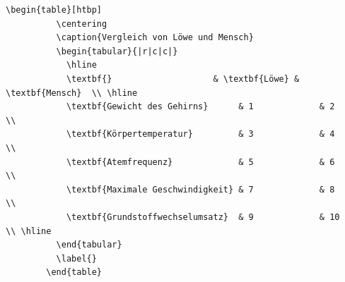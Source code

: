 \documentclass["WS\space 16-17\space -\space LaTeX-Kurs\space -\space Praesentation\space -\space 2.tex"]{subfiles}
\begin{document}
\begin{frame}[fragile]
	\Code
	\begin{lstlisting}[gobble=8]
        \begin{table}[htbp]
          \centering
          \caption{Vergleich von Löwe und Mensch}
          \begin{tabular}{|r|c|c|}
            \hline 
            \textbf{}                    & \textbf{Löwe} & \textbf{Mensch}  \\ \hline 
            \textbf{Gewicht des Gehirns}      & 1             & 2           \\
            \textbf{Körpertemperatur}         & 3             & 4           \\
            \textbf{Atemfrequenz}             & 5             & 6           \\
            \textbf{Maximale Geschwindigkeit} & 7             & 8           \\ 
            \textbf{Grundstoffwechselumsatz}  & 9             & 10          \\ \hline 
          \end{tabular} 
          \label{}
        \end{table}
	\end{lstlisting}
\end{frame}
\end{document}

